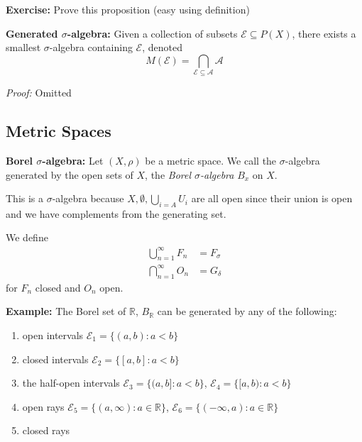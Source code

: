 \documentclass[12pt]{report}
\newcommand{\R}{\mathbb{R}}
\newcommand{\Ec}{\mathcal{E}}
\newcommand{\A}{\mathcal{A}}
\newcommand{\F}{\mathcal{F}}
\newcommand{\sub}{\subseteq}
\newenvironment*{tbox}[2][gray]{
    \begin{tcolorbox}[
        parbox=false,
        colback=#1!5!white,
        colframe=#1!75!black,
        breakable,
        title={#2}
    ]}
    {\end{tcolorbox}}
\newenvironment*{exercise}[1][red]{
    \begin{tcolorbox}[
        parbox=false,
        colback=#1!5!white,
        colframe=#1!75!black,
        breakable
    ]}
    {\end{tcolorbox}}
\begin{document}
        \begin{tbox}{\textbf{Proposition:} Let $\A_1, \A_2$ be two $\sigma$-algebras on $X$. Then $\A_1 \cap \A_2$ is also a $\sigma$-algebra}
            \begin{exercise}
                \textbf{Exercise:} Prove this proposition (easy using definition)
            \end{exercise}
        \end{tbox}

        \textbf{Generated $\sigma$-algebra:} Given a collection of subsets $\Ec \sub P(X)$, there exists a smallest $\sigma$-algebra containing $\Ec$, denoted 
        \[M(\Ec) = \bigcap_{\Ec \sub \A} \A\]

        \begin{tbox}{\textbf{Lemma:} $\Ec \sub M(\F) \implies M(\Ec) \sub M(\F)$}
            \emph{Proof:} Omitted
        \end{tbox}

    \subsection*{Metric Spaces}
        \textbf{Borel $\sigma$-algebra:} Let $(X, \rho)$ be a metric space. We call the $\sigma$-algebra generated by the open sets of $X$, the \emph{Borel $\sigma$-algebra} $B_x$ on $X$. 
    
        This is a $\sigma$-algebra because $X, \emptyset, \bigcup_{i=A} U_i$ are all open since their union is open and we have complements from the generating set. 

        We define 
        \begin{align*}
            \bigcup_{n=1}^\infty F_n &= F_{\sigma}\\ 
            \bigcap_{n=1}^\infty O_n &= G_{\delta}
        \end{align*}
        for $F_n$ closed and $O_n$ open. 

        \textbf{Example:} The Borel set of $\R$, $B_{\R}$ can be generated by any of the following:
        \begin{enumerate}
            \item open intervals $\Ec_1 = \{(a, b) : a < b\}$
            \item closed intervals $\Ec_2 = \{[a, b]: a < b\}$ 
            \item the half-open intervals $\Ec_3 = \{(a, b]: a < b\}$, $\Ec_4 = \{[a, b): a < b\}$
            \item open rays $\Ec_5 = \{(a, \infty): a \in \R\}$, $\Ec_6 = \{(-\infty, a): a \in \R\}$
            \item closed rays 
        \end{enumerate}
\end{document}
